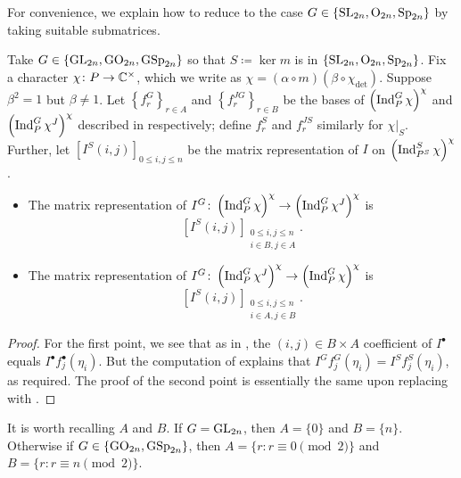 For convenience, we explain how to reduce to the case $G\in\{\mathrm{SL}_{2n},\mathrm{O}_{2n},\mathrm{Sp}_{2n}\}$ by taking suitable submatrices.
\begin{lemma} \label{lem:general-from-special-matrix}
	Take $G\in\{\mathrm{GL}_{2n},\mathrm{GO}_{2n},\mathrm{GSp}_{2n}\}$ so that $S\coloneqq\ker m$ is in $\{\mathrm{SL}_{2n},\mathrm{O}_{2n},\mathrm{Sp}_{2n}\}$. Fix a character $\chi\colon P\to\mathbb C^\times$, which we write as $\chi=(\alpha\circ m)(\beta\circ\chi_{\det})$.
    Suppose $\beta^2=1$ but $\beta\ne1$.
    Let $\left\{f_r^G\right\}_{r\in A}$ and $\left\{f_r^{JG}\right\}_{r\in B}$ be the bases of $\left(\operatorname{Ind}_P^G\chi\right)^\chi$ and $\left(\operatorname{Ind}_P^G\chi^J\right)^{\chi}$ described in  respectively; define $f_r^S$ and $f_r^{JS}$ similarly for $\chi|_S$. Further, let $\left[I^S(i,j)\right]_{0\le i,j\le n}$ be the matrix representation of $I$ on $\left(\operatorname{Ind}_{P^S}^S\chi\right)^\chi$.
	\begin{itemize}
		\item The matrix representation of $I^G\colon\left(\operatorname{Ind}_P^G\chi\right)^\chi\to\left(\operatorname{Ind}_P^G\chi^J\right)^\chi$ is
		\[\left[I^S(i,j)\right]_{\substack{0\le i,j\le n\\i\in B,j\in A}}.\]
		\item The matrix representation of $I^G\colon\left(\operatorname{Ind}_P^G\chi^J\right)^\chi\to\left(\operatorname{Ind}_P^G\chi\right)^\chi$ is
		\[\left[I^S(i,j)\right]_{\substack{0\le i,j\le n\\i\in A,j\in B}}.\]
	\end{itemize}
\end{lemma}
\begin{proof}
    For the first point, we see that as in , the $(i,j)\in B\times A$ coefficient of $I^\bullet$ equals $I^\bullet f_j^\bullet(\eta_i)$. But the computation of  explains that $I^Gf_j^G(\eta_i)=I^Sf_j^S(\eta_i)$, as required.
	The proof of the second point is essentially the same upon replacing  with .
\end{proof}
\begin{remark}
    It is worth recalling $A$ and $B$. If $G=\mathrm{GL}_{2n}$, then $A=\{0\}$ and $B=\{n\}$. Otherwise if $G\in\{\mathrm{GO}_{2n},\mathrm{GSp}_{2n}\}$, then $A=\{r:r\equiv0\pmod2\}$ and $B=\{r:r\equiv n\pmod2\}$.
\end{remark}
